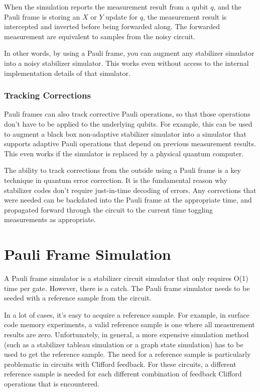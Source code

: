 \documentclass[onecolumn,unpublished]{quantumarticle}
\theoremstyle{definition}
\theoremstyle{definition}
\theoremstyle{definition}
\begin{document}
When the simulation reports the measurement result from a qubit $q$, and the Pauli frame is storing an $X$ or $Y$ update for $q$, the measurement result is intercepted and inverted before being forwarded along.
The forwarded measurement are equivalent to samples from the noisy circuit.

In other words, by using a Pauli frame, you can augment any stabilizer simulator into a noisy stabilizer simulator.
This works even without access to the internal implementation details of that simulator.

\subsubsection{Tracking Corrections}

Pauli frames can also track corrective Pauli operations, so that those operations don't have to be applied to the underlying qubits.
For example, this can be used to augment a black box non-adaptive stabilizer simulator into a simulator that supports adaptive Pauli operations that depend on previous measurement results.
This even works if the simulator is replaced by a physical quantum computer.

The ability to track corrections from the outside using a Pauli frame is a key technique in quantum error correction.
It is the fundamental reason why stabilizer codes don't require just-in-time decoding of errors.
Any corrections that were needed can be backdated into the Pauli frame at the appropriate time, and propagated forward through the circuit to the current time toggling measurements as appropriate.

\section{Pauli Frame Simulation}
\label{sec:framesim}

A Pauli frame simulator is a stabilizer circuit simulator that only requires O(1) time per gate.
However, there is a catch.
The Pauli frame simulator needs to be seeded with a reference sample from the circuit.

In a lot of cases, it's easy to acquire a reference sample.
For example, in surface code memory experiments, a valid reference sample is one where all measurement results are zero.
Unfortunately, in general, a more expensive simulation method (such as a stabilizer tableau simulation or a graph state simulation) has to be used to get the reference sample.
The need for a reference sample is particularly problematic in circuits with Clifford feedback.
For these circuits, a different reference sample is needed for each different combination of feedback Clifford operations that is encountered.
\end{document}
